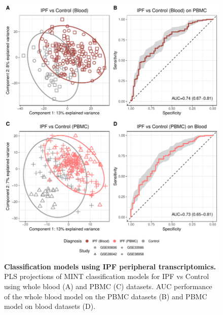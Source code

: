 \documentclass[
]{article}
\begin{document}
\begin{figure}

{\centering \includegraphics[width=1\linewidth,]{./Figures/SysReview/FigE4_blood} 

}

\caption[Upset plot of models]{\textbf{Classification models using IPF peripheral transcriptomics.} PLS projections of MINT classification models for IPF vs Control using whole blood (A) and PBMC (C) datasets. AUC performance of the whole blood model on the PBMC datasets (B) and PBMC model on blood datasets (D).}\label{fig:bloodmodel}
\end{figure}

\newpage

\captionsetup{width=6.5in}
\end{document}
